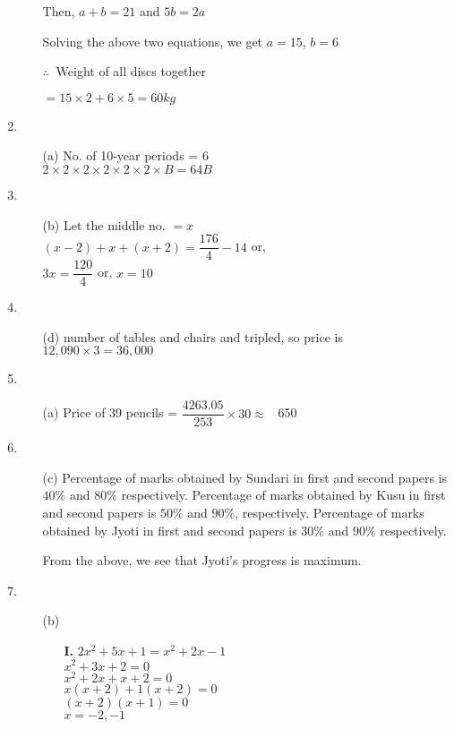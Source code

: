 \begin{multicols}{2}
\begin{enumerate}
\begin{itemize}
    Then, $a + b = 21$ and $5b = 2a$

    Solving the above two equations, we get $a = 15$, $b = 6$

    $\therefore~$ Weight of all discs together

    $= 15 \times 2 + 6 \times 5 = 60kg$
  \end{itemize}
\item
  \begin{itemize}
  \item[(a)] No. of 10-year periods = $6$\\
    $2 \times 2 \times 2 \times 2 \times 2 \times 2 \times B = 64 B$
  \end{itemize}
\item
  \begin{itemize}
  \item[(b)] Let the middle no. $= x$\\
    $(x - 2) + x + (x + 2) = \dfrac{176}{4} - 14$ or,\\
    $3x = \dfrac{120}{4}$ or, $x = 10$
  \end{itemize}
\item
  \begin{itemize}
\item[(d)] number of tables and chairs and tripled, so price is $12,090 \times 3 = 36,000$
  \end{itemize}
\item
  \begin{itemize}
\item[(a)] Price of 39 pencils = $\dfrac{4263.05}{253} \times 30 \approx$ \rupee~650
  \end{itemize}
\item
  \begin{itemize}
  \item[(c)] Percentage of marks obtained by Sundari in first and second papers is $40\%$ and $80\%$ respectively. Percentage of marks obtained by Kusu in first and second papers is $50\%$ and $90\%$, respectively. Percentage of marks obtained by Jyoti in first and second papers is $30\%$ and $90\%$ respectively.

    From the above, we see that Jyoti's progress is maximum.
  \end{itemize}
\item
  \begin{itemize}
  \item[(b)]
    \begin{itemize}
    \item[{\bf I.}] $2x^2 + 5x + 1 = x^2 + 2x - 1$\\
      $x^2 + 3x + 2 = 0$\\
      $x^2 + 2x + x + 2 = 0$\\
      $x(x + 2) + 1 (x + 2) = 0$\\
      $(x + 2)(x + 1) = 0$\\
      $x = -2, -1$


\end{itemize}
\end{itemize}
\end{enumerate}
\end{multicols}
